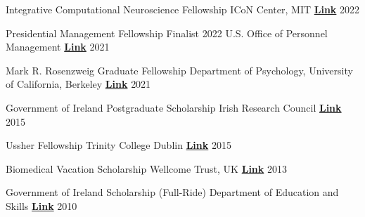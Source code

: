 

\begin{cvhonors}

 \cvhonor
    {Integrative Computational Neuroscience Fellowship} %
    {ICoN Center, MIT}
    {\href{https://yangtan.mit.edu/supported-researchers/}{\textbf{Link}}}
  	{2022}

 \cvhonor
    {Presidential Management Fellowship Finalist 2022} %
    {U.S. Office of Personnel Management}
    {\href{https://apply.pmf.gov/finalists.aspx}{\textbf{Link}}}
  	{2021}

 \cvhonor
    {Mark R. Rosenzweig Graduate Fellowship} %
    {Department of Psychology, University of California, Berkeley}
    {\href{https://psychology.berkeley.edu/give/endowed-funds}{\textbf{Link}}}
  	{2021}

 \cvhonor
   {Government of Ireland Postgraduate Scholarship}
   {Irish Research Council}
   {\href{https://research.ie/funding/goipg/}{\textbf{Link}}}
   {2015}
   
 \cvhonor
   {Ussher Fellowship}
   {Trinity College Dublin}
   {\href{https://www.tcd.ie/study/international/scholarships/Postgraduate/ussher.php}{\textbf{Link}}}
   {2015}

  \cvhonor
   {Biomedical Vacation Scholarship}
   {Wellcome Trust, UK}
   {\href{https://wellcome.org/}{\textbf{Link}}}
   {2013}

  \cvhonor
   {Government of Ireland Scholarship (Full-Ride)}
   {Department of Education and Skills}
   {\href{https://www.gov.ie/en/service/third-level-scholarships/}{\textbf{Link}}}
   {2010}
   
\end{cvhonors}


